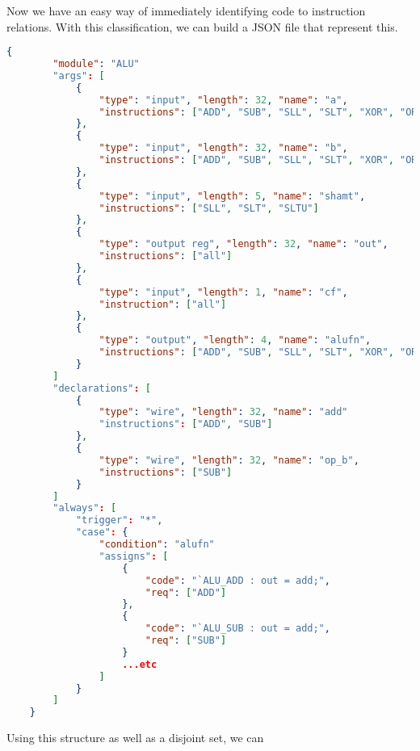 \documentclass[]{article}
\begin{document}
	Now we have an easy way of immediately identifying code to instruction relations.
	With this classification, we can build a JSON file that represent this.

	\pagebreak
	\begin{lstlisting}[language=json,caption=example JSON]
	{
		"module": "ALU"
		"args": [
			{
				"type": "input", "length": 32, "name": "a",
				"instructions": ["ADD", "SUB", "SLL", "SLT", "XOR", "OR", "SRA", "AND", "ADDI", "SLTI", "SLTIU", "XORI", "ORI", "ANDI", "SLLI", "SRLI", "SRLI", "SRAI"]
			},
			{
				"type": "input", "length": 32, "name": "b",
				"instructions": ["ADD", "SUB", "SLL", "SLT", "XOR", "OR", "SRA", "AND", "ADDI", "SLTI", "SLTIU", "XORI", "ORI", "ANDI", "SLLI", "SRLI", "SRLI", "SRAI"]
			},
			{
				"type": "input", "length": 5, "name": "shamt",
				"instructions": ["SLL", "SLT", "SLTU"]
			},
			{
				"type": "output reg", "length": 32, "name": "out",
				"instructions": ["all"]
			},
			{
				"type": "input", "length": 1, "name": "cf",
				"instruction": ["all"]
			},
			{
				"type": "output", "length": 4, "name": "alufn",
				"instructions": ["ADD", "SUB", "SLL", "SLT", "XOR", "OR", "SRA", "AND", "ADDI", "SLTI", "SLTIU", "XORI", "ORI", "ANDI", "SLLI", "SRLI", "SRLI", "SRAI"]
			}
		]
		"declarations": [
			{
				"type": "wire", "length": 32, "name": "add"
				"instructions": ["ADD", "SUB"]
			},
			{
				"type": "wire", "length": 32, "name": "op_b",
				"instructions": ["SUB"]
			}
		]
		"always": [
			"trigger": "*",
			"case": {
				"condition": "alufn"
				"assigns": [
					{
						"code": "`ALU_ADD : out = add;",
						"req": ["ADD"]
					},
					{
						"code": "`ALU_SUB : out = add;",
						"req": ["SUB"]
					}
					...etc
				]
			}
		]
	}
	\end{lstlisting}

	Using this structure as well as a disjoint set, we can 
\end{document}
